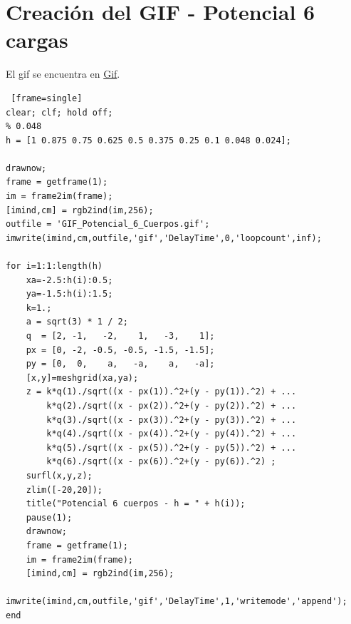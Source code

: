 \documentclass{article}
\begin{document}
\clearpage
\newpage

  
\section{Creación del GIF - Potencial 6 cargas}

El gif se encuentra en \textcolor{blue}{  \href{https://github.com/CarlosMestas/FC_CarlosMestas_Practica7/blob/master/gif/GIF_Potencial_6_Cuerpos.gif}{Gif}}.
  
\begin{lstlisting} [frame=single]
clear; clf; hold off;
% 0.048
h = [1 0.875 0.75 0.625 0.5 0.375 0.25 0.1 0.048 0.024];

drawnow;
frame = getframe(1);
im = frame2im(frame);        
[imind,cm] = rgb2ind(im,256);       
outfile = 'GIF_Potencial_6_Cuerpos.gif';
imwrite(imind,cm,outfile,'gif','DelayTime',0,'loopcount',inf);

for i=1:1:length(h)
    xa=-2.5:h(i):0.5;
    ya=-1.5:h(i):1.5;
    k=1.; 
    a = sqrt(3) * 1 / 2;
    q  = [2, -1,   -2,    1,   -3,    1];
    px = [0, -2, -0.5, -0.5, -1.5, -1.5];
    py = [0,  0,    a,   -a,    a,   -a];
    [x,y]=meshgrid(xa,ya);
    z = k*q(1)./sqrt((x - px(1)).^2+(y - py(1)).^2) + ...
        k*q(2)./sqrt((x - px(2)).^2+(y - py(2)).^2) + ...
        k*q(3)./sqrt((x - px(3)).^2+(y - py(3)).^2) + ...
        k*q(4)./sqrt((x - px(4)).^2+(y - py(4)).^2) + ...
        k*q(5)./sqrt((x - px(5)).^2+(y - py(5)).^2) + ...
        k*q(6)./sqrt((x - px(6)).^2+(y - py(6)).^2) ;
    surfl(x,y,z);
    zlim([-20,20]); 
    title("Potencial 6 cuerpos - h = " + h(i));
    pause(1);
    drawnow;
    frame = getframe(1);
    im = frame2im(frame);        
    [imind,cm] = rgb2ind(im,256);       
    imwrite(imind,cm,outfile,'gif','DelayTime',1,'writemode','append');
end
\end{lstlisting}
\end{document}

